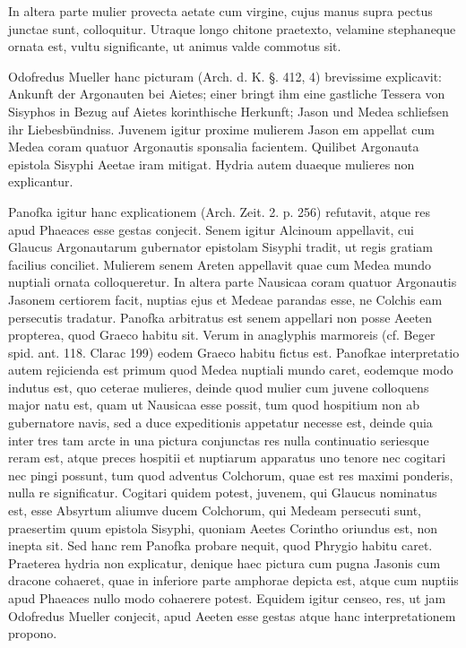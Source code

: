 \documentclass[a4paper, 11pt, oneside, polutonikogreek, german]{article}
\begin{document}
In altera parte mulier provecta aetate cum virgine, cujus manus supra pectus junctae sunt, colloquitur. Utraque longo chitone praetexto, velamine stephaneque ornata est, vultu significante, ut animus valde commotus sit.

Odofredus Mueller hanc picturam (Arch. d. K. §. 412, 4) brevissime explicavit: Ankunft der Argonauten bei Aietes; einer bringt ihm eine gastliche Tessera von Sisyphos in Bezug auf Aietes korinthische Herkunft; Jason und Medea schliefsen ihr Liebesbündniss. Juvenem igitur proxime mulierem Jason em appellat cum Medea coram quatuor Argonautis sponsalia facientem. Quilibet Argonauta epistola Sisyphi Aeetae iram mitigat. Hydria autem duaeque mulieres non explicantur.

Panofka igitur hanc explicationem (Arch. Zeit. 2. p. 256) refutavit, atque res apud Phaeaces esse gestas conjecit. Senem igitur Alcinoum appellavit, cui Glaucus Argonautarum gubernator epistolam Sisyphi tradit, ut regis gratiam facilius conciliet. Mulierem senem Areten appellavit quae cum Medea mundo nuptiali ornata colloqueretur. In altera parte Nausicaa coram quatuor Argonautis Jasonem certiorem facit, nuptias ejus et Medeae parandas esse, ne Colchis eam persecutis tradatur. Panofka arbitratus est senem appellari non posse Aeeten propterea, quod Graeco habitu sit. Verum in anaglyphis marmoreis (cf. Beger spid. ant. 118. Clarac 199) eodem Graeco habitu fictus est. Panofkae interpretatio autem rejicienda est primum quod Medea nuptiali mundo caret, eodemque modo indutus est, quo ceterae mulieres, deinde quod mulier cum juvene colloquens major natu est, quam ut Nausicaa esse possit, tum quod hospitium non ab gubernatore navis, sed a duce expeditionis appetatur necesse est, deinde quia inter tres tam arcte in una pictura conjunctas res nulla continuatio seriesque reram est, atque preces hospitii et nuptiarum apparatus uno tenore nec cogitari nec pingi possunt, tum quod adventus Colchorum, quae est res maximi ponderis, nulla re significatur. Cogitari quidem potest, juvenem, qui Glaucus nominatus est, esse Absyrtum aliumve ducem Colchorum, qui Medeam persecuti sunt, praesertim quum epistola Sisyphi, quoniam Aeetes Corintho oriundus est, non inepta sit. Sed hanc rem Panofka probare nequit, quod Phrygio habitu caret. Praeterea hydria non explicatur, denique haec pictura cum pugna Jasonis cum dracone cohaeret, quae in inferiore parte amphorae depicta est, atque cum nuptiis apud Phaeaces nullo modo cohaerere potest. Equidem igitur censeo, res, ut jam Odofredus Mueller conjecit, apud Aeeten esse gestas atque hanc interpretationem propono.
\end{document}
